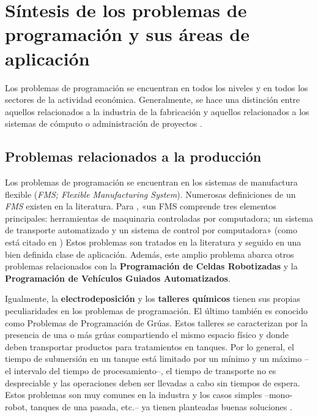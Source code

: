 \documentclass[spanish,draft,12pt,headsepline,footsepline,paper=letter]{scrreprt}
\begin{document}
\section{Síntesis de los problemas de programación y sus áreas de aplicación}
\label{sintesis_problemas_programacion}

Los problemas de programación se encuentran en todos los niveles y en todos los sectores de la actividad económica. Generalmente, se hace una distinción entre aquellos relacionados a la industria de la fabricación y aquellos relacionados a los sistemas de cómputo o administración de proyectos \citep[p.~6]{TKindt2002}.

\subsection{Problemas relacionados a la producción} %
\label{problemas_relacionados_produccion}

Los problemas de programación se encuentran en los sistemas de manufactura flexible (\textit{FMS; Flexible Manufacturing System}). Numerosas definiciones de un \textit{FMS} existen en la literatura. Para \citet{liu1996classification}, «un FMS comprende tres elementos principales: herramientas de maquinaria controladas por computadora; un sistema de transporte automatizado y un sistema de control por computadora» (como está citado en \citealp[p.~6]{TKindt2002})  Estos problemas son tratados en la literatura y seguido en una bien definida clase de aplicación. Además, este amplio problema abarca otros problemas relacionados con la \textbf{Programación de Celdas Robotizadas} y la \textbf{Programación de Vehículos Guiados Automatizados}.

Igualmente, la \textbf{electrodeposición} y los \textbf{talleres químicos} tienen sus propias peculiaridades en los problemas de programación. El último también es conocido como Problemas de Programación de Grúas. Estos talleres se caracterizan por la presencia de una o más grúas compartiendo el mismo espacio físico y donde deben transportar productos para tratamientos en tanques. Por lo general, el tiempo de submersión en un tanque está limitado por un mínimo y un máximo –el intervalo del tiempo de procesamiento–, el tiempo de transporte no es despreciable y las operaciones deben ser llevadas a cabo sin tiempos de espera. Estos problemas son muy comunes en la industra y los casos simples –mono-robot, tanques de una pasada, etc.– ya tienen planteadas buenas soluciones \citep[p.~6,~7]{TKindt2002}.
\end{document}
